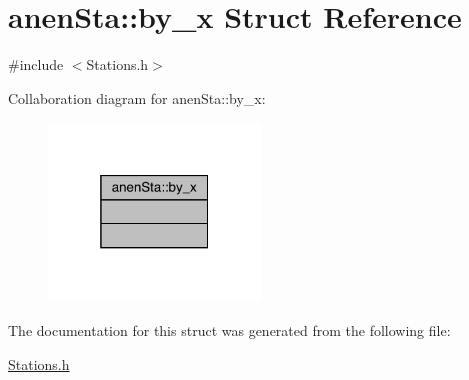 \hypertarget{structanen_sta_1_1by__x}{}\section{anen\+Sta\+:\+:by\+\_\+x Struct Reference}
\label{structanen_sta_1_1by__x}


{\ttfamily \#include $<$Stations.\+h$>$}



Collaboration diagram for anen\+Sta\+:\+:by\+\_\+x\+:
\nopagebreak
\begin{figure}[H]
\begin{center}
\leavevmode
\includegraphics[width=160pt]{structanen_sta_1_1by__x__coll__graph}
\end{center}
\end{figure}


The documentation for this struct was generated from the following file\+:\begin{DoxyCompactItemize}
\item 
\mbox{\hyperlink{_stations_8h}{Stations.\+h}}\end{DoxyCompactItemize}
